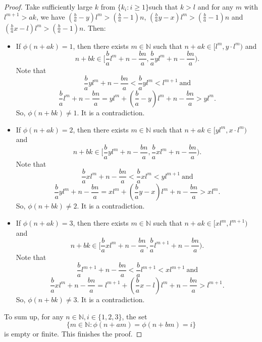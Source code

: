 \documentclass[reqno,12pt]{amsart}
\def \N {\mathbb N}
\numberwithin{equation}{section}
\begin{document}
\begin{proof}
	Take sufficiently large $k$ from $\{k_i:i\ge 1\}$such that $k>l$ and for any $m$ with $l^{m+1}>ak$, we have $(\frac{b}{a}-y)l^m>(\frac{b}{a}-1)n$, $(\frac{b}{a}y-x)l^m>(\frac{b}{a}-1)n$ and $(\frac{b}{a}x-l)l^m>(\frac{b}{a}-1)n$. Then:
	\begin{itemize}
		\item If $\phi(n+ak)=1$, then there exists $m\in \N$ such that $n+ak\in [l^m,y\cdot l^m)$ and $$n+bk\in [\frac{b}{a}l^{m}+n-\frac{bn}{a},\frac{b}{a}yl^{m}+n-\frac{bn}{a}).$$
		Note that $$\frac{b}{a}yl^{m}+n-\frac{bn}{a}<\frac{b}{a}yl^{m}<l^{m+1}\ \text{and}$$
		$$\frac{b}{a}l^{m}+n-\frac{bn}{a}=yl^{m}+(\frac{b}{a}-y)l^{m}+n-\frac{bn}{a}>yl^{m}.$$ So, $\phi(n+bk)\neq 1$. It is a contradiction.
		\item If $\phi(n+ak)=2$, then there exists $m\in \N$ such that $n+ak\in [yl^m,x\cdot l^m)$ and $$n+bk\in [\frac{b}{a}yl^{m}+n-\frac{bn}{a},\frac{b}{a}xl^{m}+n-\frac{bn}{a}).$$ Note that $$\frac{b}{a}xl^{m}+n-\frac{bn}{a}<\frac{b}{a}xl^{m}<yl^{m+1}\ \text{and}$$
		$$\frac{b}{a}yl^{m}+n-\frac{bn}{a}=xl^{m}+(\frac{b}{a}y-x)l^{m}+n-\frac{bn}{a}>xl^{m}.$$ So, $\phi(n+bk)\neq 2$. It is a contradiction.
		\item If $\phi(n+ak)=3$, then there exists $m\in \N$ such that $n+ak\in [xl^m, l^{m+1})$ and $$n+bk\in [\frac{b}{a}xl^{m}+n-\frac{bn}{a},\frac{b}{a}l^{m+1}+n-\frac{bn}{a}).$$ Note that $$\frac{b}{a}l^{m+1}+n-\frac{bn}{a}<\frac{b}{a}l^{m+1}<xl^{m+1}\ \text{and}$$ $$\frac{b}{a}xl^{m}+n-\frac{bn}{a}=l^{m+1}+(\frac{b}{a}x-l)l^{m}+n-\frac{bn}{a}>l^{m+1}.$$ So, $\phi(n+bk)\neq 3$. It is a contradiction.
	\end{itemize}
	To sum up, for any $n\in \N,i\in \{1,2,3\}$, the set $$\{m\in \N:\phi(n+am)=\phi(n+bm)=i\}$$ is empty or finite. This finishes the proof.
 \end{proof}
\end{document}
